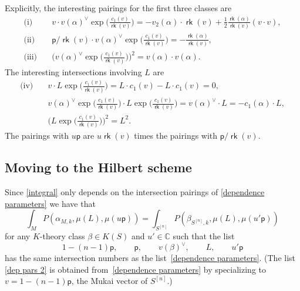 \documentclass[pdftex]{sigma}
\numberwithin{equation}{section}
\newcommand{\BC}{{\mathbb{C}}}
\newcommand{\pt}{{\mathsf{p}}}
\newcommand{\1}{\mathsf{1}}
\newcommand\rk{\operatorname{\mathsf{rk}}}
\begin{document}
Explicitly, the interesting pairings for the first three classes are
\begin{align*}
\text{(i)} \quad   & v \cdot v(\alpha)^{\vee} \exp\bigg( \frac{c_1(v)}{\rk(v)}\bigg)
= - v_2(\alpha) \cdot \rk(v) + \frac{1}{2} \frac{\rk(\alpha)}{\rk(v)} (v \cdot v),
\\
\text{(ii)} \quad   & \pt/ \rk(v) \cdot v(\alpha)^{\vee} \exp\bigg( \frac{c_1(v)}{\rk(v)} \bigg)
= - \frac{\rk(\alpha)}{\rk(v)},
\\
\text{(iii)} \quad   & \bigg(v(\alpha)^{\vee} \exp\bigg( \frac{c_1(v)}{\rk(v)}\bigg)\bigg)^2 = v(\alpha) \cdot v(\alpha).
\end{align*}
The interesting intersections involving $L$ are
\begin{align*}
\text{(iv)} \quad   & v \cdot L  \exp\bigg( \frac{c_1(v)}{\rk(v)} \bigg)
= L \cdot c_1(v) - L \cdot c_1(v) = 0,
\\
& v(\alpha)^{\vee} \exp\bigg( \frac{c_1(v)}{\rk(v)} \bigg)\cdot
L  \exp\bigg( \frac{c_1(v)}{\rk(v)} \bigg)= v(\alpha)^{\vee} \cdot L = -c_1(\alpha) \cdot L,
\\
& \bigg( L  \exp\bigg( \frac{c_1(v)}{\rk(v)} \bigg) \bigg)^2 = L^2.
\end{align*}
The pairings with $u \pt$ are
$u \rk(v)$ times the pairings with $\pt/\rk(v)$.

\subsection{Moving to the Hilbert scheme}
Since \eqref{integral} only depends on the intersection pairings of \eqref{dependence parameters} we have that
\[
\int_{M} P(\alpha_{M,k}, \mu(L), \mu(u \pt))
=
\int_{S^{[n]}} P(\beta_{S^{[n]},k}, \mu(L), \mu(u' \pt))
\]
for any $K$-theory class $\beta \in K(S)$
and $u'\in \BC$ such that the list
\begin{equation}
\label{dep pars 2}
1 - (n-1)\pt, \qquad
\pt, \qquad
v(\beta)^{\vee},
\qquad L,
\qquad u' \pt
\end{equation}
has the same intersection numbers as the list~\eqref{dependence parameters}.
(The list \eqref{dep pars 2} is obtained from~\eqref{dependence parameters} by specializing to
$v=1-(n-1)\pt$, the Mukai vector of $S^{[n]}$.)
\end{document}

